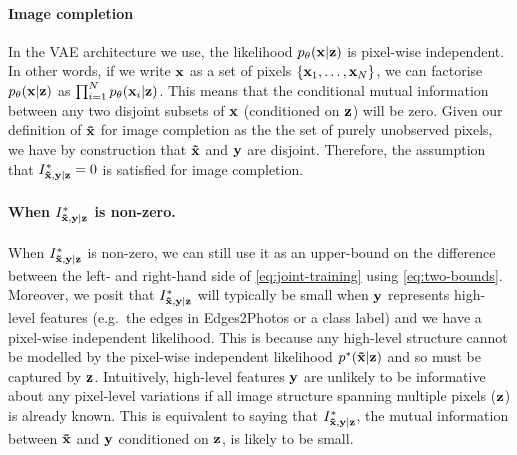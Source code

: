 \paragraph{Image completion}
In the VAE architecture we use, the likelihood $p_\theta({\mathbf{x}}|{\mathbf{z}})$ is pixel-wise
independent. In other words, if we write ${\mathbf{x}}$ as a set of pixels
$\{{\mathbf{x}}_1,\ldots,{\mathbf{x}}_N\}$, we can factorise $p_\theta({\mathbf{x}}|{\mathbf{z}})$ as
$\prod_{i=1}^Np_\theta({\mathbf{x}}_i|{\mathbf{z}})$. This means that the conditional mutual
information between any two disjoint subsets of ${\mathbf{x}}$ (conditioned on ${\mathbf{z}}$) will
be zero. Given our definition of $\mathbf{\tilde{x}}{}$ for image completion as the the set
of purely unobserved pixels, we have by construction that $\mathbf{\tilde{x}}{}$ and
${\mathbf{y}}$ are disjoint. Therefore, the assumption that $I^*_{\mathbf{\tilde{x}}{},\mathbf{y}{}|\mathbf{z}{}}{}=0$ is
satisfied for image completion.


\paragraph{When $I^*_{\mathbf{\tilde{x}}{},\mathbf{y}{}|\mathbf{z}{}}{}$ is non-zero.}
When $I^*_{\mathbf{\tilde{x}}{},\mathbf{y}{}|\mathbf{z}{}}{}$ is non-zero, we can still use it as an upper-bound on the
difference between the left- and right-hand side of \cref{eq:joint-training}
using \cref{eq:two-bounds}.
%
Moreover, we posit that $I^*_{\mathbf{\tilde{x}}{},\mathbf{y}{}|\mathbf{z}{}}{}$ will typically be small when ${\mathbf{y}}$
represents high-level features (e.g.~the edges in Edges2Photos or a class label)
and we have a pixel-wise independent likelihood. This is because any high-level
structure cannot be modelled by the pixel-wise independent likelihood
${p}^*{}(\mathbf{\tilde{x}}{}|{\mathbf{z}})$ and so must be captured by ${\mathbf{z}}$. Intuitively, high-level
features ${\mathbf{y}}$ are unlikely to be informative about any pixel-level
variations if all image structure spanning multiple pixels (${\mathbf{z}}$) is already
known. This is equivalent to saying that $I^*_{\mathbf{\tilde{x}}{},\mathbf{y}{}|\mathbf{z}{}}{}$, the mutual information
between $\mathbf{\tilde{x}}{}$ and ${\mathbf{y}}$ conditioned on ${\mathbf{z}}$, is likely to be small.

